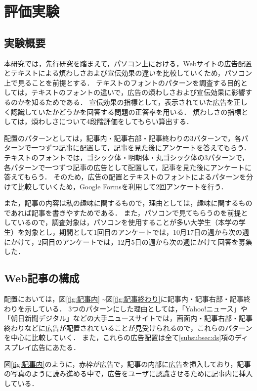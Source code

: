\documentclass[12pt,a4j,titlepage]{ltjsarticle}
\begin{document}
\clearpage

\section{評価実験}
\subsection{実験概要}
本研究では，先行研究を踏まえて，パソコン上における，Webサイトの広告配置とテキストによる煩わしさおよび宣伝効果の違いを比較していくため，パソコン上で見ることを前提とする．
テキストのフォントのパターンを調査する目的としては，テキストのフォントの違いで，広告の煩わしさおよび宣伝効果に影響するのかを知るためである．
宣伝効果の指標として，表示されていた広告を正しく認識していたかどうかを回答する問題の正答率を用いる．
煩わしさの指標としては，煩わしさについて4段階評価をしてもらい算出する．

配置のパターンとしては，記事内・記事右部・記事終わりの3パターンで，各パターンで一つずつ記事に配置して，記事を見た後にアンケートを答えてもらう．
テキストのフォントでは，ゴシック体・明朝体・丸ゴシック体の3パターンで，各パターンで一つずつ記事の広告として配置して，記事を見た後にアンケートに答えてもらう．
そのため，広告の配置とテキストのフォントによるパターンを分けて比較していくため，Google Formsを利用して2回アンケートを行う．

また，記事の内容は私の趣味に関するもので，理由としては，趣味に関するものであれば記事を書きやすためである．
また，パソコンで見てもらうのを前提としているので，調査対象は，パソコンを使用することが多い大学生（本学の学生）を対象とし，期間として1回目のアンケートでは，10月17日の週から次の週にかけて，2回目のアンケートでは，12月5日の週から次の週にかけて回答を募集した．

\subsection{Web記事の構成}
配置においては，図\ref{fig:記事内} \textasciitilde 図\ref{fig:記事終わり}に記事内・記事右部・記事終わりを示している．
3つのパターンにした理由としては，「Yahoo!ニュース」や「朝日新聞デジタル」などの大手ニュースサイトでは，画面内・記事右部・記事終わりなどに広告が配置されていることが見受けられるので，これらのパターンを中心に比較していく．
また，これらの広告配置は全て\ref{subsubsec:ds}項のディスプレイ広告にあたる．

図\ref{fig:記事内}のように，赤枠が広告で，記事の内部に広告を挿入しており，記事の写真のように読み進める中で，広告をユーザに認識させるために記事内に挿入している．
\end{document}
